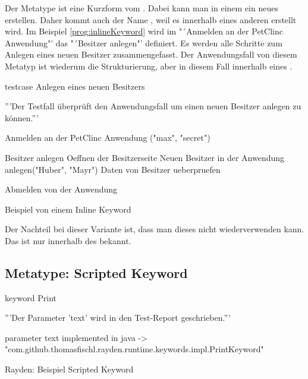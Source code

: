 Der Metatype  ist eine Kurzform vom . Dabei kann man in einem  ein neues  erstellen. Daher kommt auch der Name , weil es innerhalb eines anderen  erstellt wird. Im Beispiel \ref{prog:inlineKeyword} wird im  "´Anmelden an der PetClinc Anwendung"' das  "´Besitzer anlegen"' definiert. Es werden alle Schritte zum Anlegen eines neuen Besitzer zusammengefasst. Der Anwendungsfall von diesem Metatyp ist wiederum die Strukturierung, aber in diesem Fall innerhalb eines . 

\begin{program}
\begin{JavaCode}
testcase Anlegen eines neuen Besitzers {
	'''Der Testfall überprüft den Anwendungsfall um einen 
	   neuen Besitzer anlegen zu können.'''
	
	Anmelden an der PetClinc Anwendung ("max", "secret")
	
	Besitzer anlegen {
		Oeffnen der Besitzerseite		
		Neuen Besitzer in der Anwendung anlegen("Huber", "Mayr")
		Daten von Besitzer ueberpruefen
	}
	
	Abmelden von der Anwendung
}
\end{JavaCode}
\caption{Beispiel von einem Inline Keyword}
\label{prog:inlineKeyword}
\end{program}

\SuperPar
Der Nachteil bei dieser Variante ist, dass man dieses  nicht wiederverwenden kann. Das  ist nur innerhalb des  bekannt.


\subsection{Metatype: Scripted Keyword}

\begin{program}
\begin{JavaCode}
keyword Print {
	'''Der Parameter 'text' wird in den Test-Report geschrieben.'''
	
	parameter text
	implemented in java -> "com.github.thomasfischl.rayden.runtime.keywords.impl.PrintKeyword"
}
\end{JavaCode}
\caption{Rayden: Beispiel Scripted Keyword}
\label{prog:scriptedKeyword}
\end{program}


